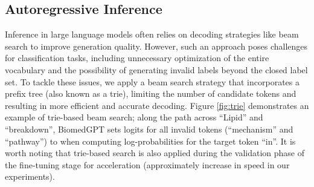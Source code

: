 \documentclass[10pt]{article} \usepackage[preprint]{tmlr}
\begin{document}
\begin{table*}
\centering
\caption{Detailed model configuration of BiomedGPT. During the pretraining phase, image processing involves resizing and cropping the images to varying resolutions, corresponding to the input sizes listed in the table. It should be noted that during fine-tuning and inference stages, the input resolution of BiomedGPT can be flexibly adjusted according to the specific requirements of the task.}
\label{tab:scaling}
\end{table*}



\subsection{Autoregressive Inference} 
Inference in large language models often relies on decoding strategies like beam search to improve generation quality. However, such an approach poses challenges for classification tasks, including unnecessary optimization of the entire vocabulary and the possibility of generating invalid labels beyond the closed label set. To tackle these issues, we apply a beam search strategy that incorporates a prefix tree (also known as a trie), limiting the number of candidate tokens and resulting in more efficient and accurate decoding. Figure \ref{fig:trie} demonstrates an example of trie-based beam search; along the path across ``Lipid'' and ``breakdown'', BiomedGPT sets logits for all invalid tokens (``mechanism'' and ``pathway'') to  when computing log-probabilities for the target token ``in''. It is worth noting that trie-based search is also applied during the validation phase of the fine-tuning stage for acceleration (approximately  increase in speed in our experiments).
\end{document}
